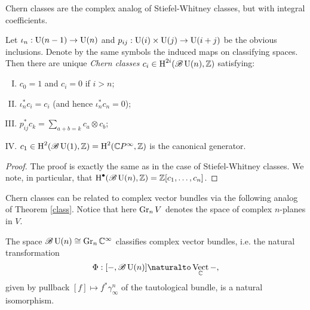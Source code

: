 \documentclass{amsart}
\DeclareMathOperator{\Vect}{Vect}
\begin{document}
Chern classes are the complex analog of Stiefel-Whitney classes, but with integral coefficients.
\begin{theorem}
    Let $\iota_n:\operatorname{U}(n-1)\to\operatorname{U}(n)$ and $p_{ij}:\operatorname{U}(i)\times \operatorname{U}(j)\to \operatorname{U}(i+j)$ be the obvious
    inclusions. Denote by the same symbols the induced maps on classifying spaces.
    Then there are unique \textit{Chern classes} $c_i\in \operatorname{H}^{2i}(\mathscr{B}\operatorname{U}(n), \mathbb{Z})$ satisfying:
    \begin{enumerate}[(I)]
        \item $c_0=1$ and $c_i=0$ if $i>n$;
        \item $\iota_n^*c_i=c_i$ (and hence $\iota_n^*c_n=0$);
        \item $p_{ij}^*c_k=\sum_{a+b=k}c_a\otimes c_b$;
        \item $c_1\in\operatorname{H}^2(\mathscr{B}\operatorname{U}(1),\mathbb{Z})=\operatorname{H}^2(\mathbb{C} P^\infty,\mathbb{Z})$ is the canonical generator.
    \end{enumerate}
    \label{chern}
\end{theorem}
\begin{proof}
    The proof is exactly the same as in the case of Stiefel-Whitney classes.
    We note, in particular, that $\operatorname{H}^\bullet(\mathscr{B}\operatorname{U}(n),\mathbb{Z})=\mathbb{Z}[c_1,\ldots,c_n]$.
\end{proof}

Chern classes can be related to complex vector bundles via the following analog of Theorem
\ref{class}. Notice that here $\operatorname{Gr}_n V$ denotes the space of complex $n$-planes in $V$.
\begin{theorem}
    The space $\mathscr{B}\operatorname{U}(n)\cong\operatorname{Gr}_n\mathbb{C}^\infty$ classifies complex vector bundles, i.e. the natural
    transformation
    \begin{equation*}
        \Phi: [-,\mathscr{B}\UU(n)] \naturalto \Vect_\C-,
    \end{equation*}
    given by pullback $[f]\mapsto f^*\gamma^n_\infty$ of the tautological bundle, is a natural isomorphism.
\end{theorem}
\end{document}

